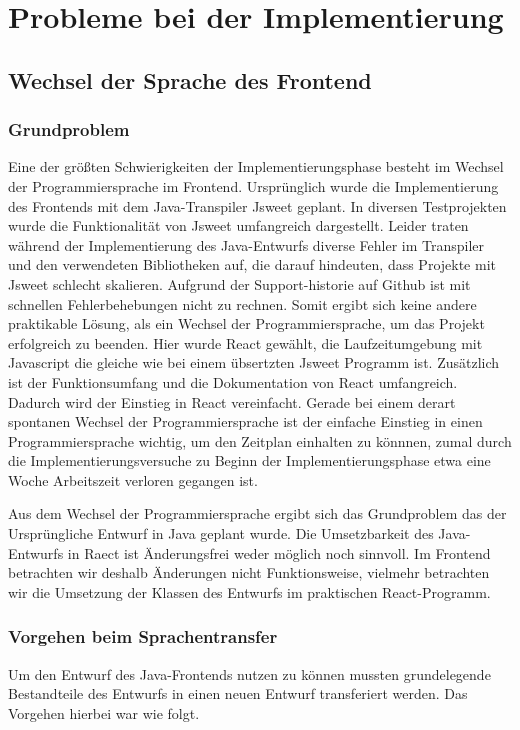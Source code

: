 \section{Probleme bei der Implementierung}

\subsection{Wechsel der Sprache des Frontend}
\subsubsection{Grundproblem}
Eine der größten Schwierigkeiten der Implementierungsphase besteht im Wechsel der Programmiersprache im Frontend.
Ursprünglich wurde die Implementierung des Frontends mit dem Java-Transpiler Jsweet geplant.
In diversen Testprojekten wurde die Funktionalität von Jsweet umfangreich dargestellt.
Leider traten während der Implementierung des Java-Entwurfs diverse Fehler im Transpiler und den verwendeten Bibliotheken auf, die darauf hindeuten, dass Projekte mit Jsweet schlecht skalieren.
Aufgrund der Support-historie auf Github ist mit schnellen Fehlerbehebungen nicht zu rechnen.
Somit ergibt sich keine andere praktikable Lösung, als ein Wechsel der Programmiersprache, um das Projekt erfolgreich zu beenden.
Hier wurde React gewählt, die Laufzeitumgebung mit Javascript die gleiche wie bei einem übsertzten Jsweet Programm ist.
Zusätzlich ist der Funktionsumfang und die Dokumentation von React umfangreich.
Dadurch wird der Einstieg in React vereinfacht.
Gerade bei einem derart spontanen Wechsel der Programmiersprache ist der einfache Einstieg in einen Programmiersprache wichtig, um den Zeitplan einhalten zu könnnen, zumal durch die Implementierungsversuche zu Beginn der Implementierungsphase etwa eine Woche Arbeitszeit verloren gegangen ist.

Aus dem Wechsel der Programmiersprache ergibt sich das Grundproblem das der Ursprüngliche Entwurf in Java geplant wurde. Die Umsetzbarkeit des Java-Entwurfs in Raect ist Änderungsfrei weder möglich noch sinnvoll.
Im Frontend betrachten wir deshalb Änderungen nicht Funktionsweise, vielmehr betrachten wir die Umsetzung der Klassen des Entwurfs im praktischen React-Programm.

\subsubsection{Vorgehen beim Sprachentransfer}
Um den Entwurf des Java-Frontends nutzen zu können mussten grundelegende Bestandteile des Entwurfs in einen neuen Entwurf transferiert werden.
Das Vorgehen hierbei war wie folgt.


